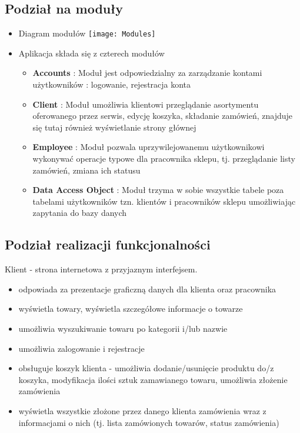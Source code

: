 \documentclass[10pt,a4paper]{article}
\begin{document}
		\subsection{Podział na moduły}
		\begin{itemize}
		  \item Diagram modułów
  		  \texttt{[image: Modules]}
		  \item Aplikacja składa się z czterech modułów
		  \begin{itemize}
   	 	    \item \textbf{Accounts} : Moduł jest odpowiedzialny za zarządzanie kontami użytkowników 
   	 	  	    					: logowanie, rejestracja konta
 		  	\item \textbf{Client}   : Moduł umożliwia klientowi przeglądanie asortymentu oferowanego
 		     						  przez serwis, edycję koszyka, składanie zamówień, 
 		     						  znajduje się tutaj również wyświetlanie strony głównej
		  	\item \textbf{Employee} : Moduł pozwala uprzywilejowanemu użytkownikowi wykonywać operacje
		  							  typowe dla pracownika sklepu, tj. przeglądanie listy zamówień, 
		  							  zmiana ich statusu
		  	\item \textbf{Data
		  			    Access
		  				Object     }: Moduł trzyma w sobie wszystkie tabele poza tabelami użytkowników 
		  							  tzn. klientów i pracowników sklepu umożliwiając zapytania do bazy danych
 		  \end{itemize}
		\end{itemize}
		
		\subsection{Podział realizacji funkcjonalności}
		Klient - strona internetowa z przyjaznym interfejsem.
		\begin{itemize}
		  \item odpowiada za prezentacje graficzną danych dla klienta oraz pracownika
		  \item wyświetla towary, wyświetla szczegółowe informacje o towarze
		  \item umożliwia wyszukiwanie towaru po kategorii i/lub nazwie
		  \item umożliwia zalogowanie i rejestracje
		  \item obsługuje koszyk klienta - umożliwia dodanie/usunięcie produktu do/z koszyka, 
		  		modyfikacja ilości sztuk zamawianego towaru, umożliwia złożenie zamówienia 	
		  \item wyświetla wszystkie złożone przez danego klienta zamówienia wraz z informacjami o nich 
		  		(tj. lista zamówionych towarów, status zamówienia)
		\end{itemize}
	
\end{document}
